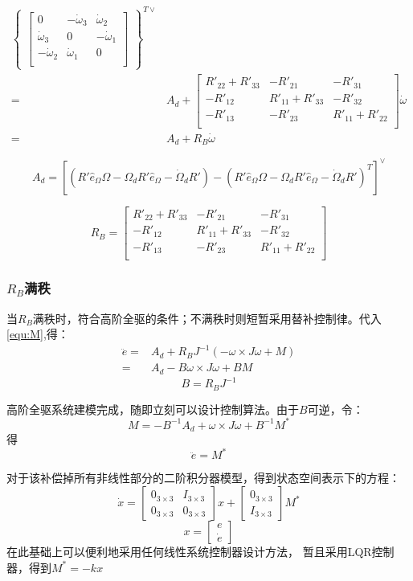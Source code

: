$$\begin{aligned}
\begin{Bmatrix}
\begin{bmatrix}
        0 & -\dot\omega_3 &\dot\omega_2  \\
         \dot\omega_3& 0 &  -\dot\omega_1\\
         -\dot\omega_2&\dot\omega_1  & 0 \\
        \end{bmatrix}\end{Bmatrix}^{T\vee}\\
        =&A_d+\begin{bmatrix}
        R'_{22}+R'_{33} & -R'_{21} & -R'_{31} \\
         -R'_{12}& R'_{11}+R'_{33} & -R'_{32} \\
         -R'_{13}&- R'_{23} & R'_{11}+R'_{22} \\
        \end{bmatrix}\dot \omega\\
        =&A_d+R_B\dot \omega
        \end{aligned}  $$

        $$A_d=[(R' \hat e_\Omega \Omega  -\Omega_d R' \hat e_\Omega -\dot \Omega_d R')-(R' \hat e_\Omega \Omega  -\Omega_d R' \hat e_\Omega -\dot \Omega_d R')^T]^\vee$$

        $$R_B=\begin{bmatrix}
            R'_{22}+R'_{33} & -R'_{21} & -R'_{31} \\
             -R'_{12}& R'_{11}+R'_{33} & -R'_{32} \\
             -R'_{13}&- R'_{23} & R'_{11}+R'_{22} \\
            \end{bmatrix}$$
\subsubsection*{$R_B$满秩}
    当$R_B$满秩时，符合高阶全驱的条件；不满秩时则短暂采用替补控制律。代入\ref{equ:M},得：
    $$\begin{aligned}
        \ddot e=&A_d+R_B J^{-1}(-\omega \times J\omega+M)\\
        =&A_d-B \omega\times J\omega +BM
        \end{aligned}$$
        $$B=R_BJ^{-1}$$

    高阶全驱系统建模完成，随即立刻可以设计控制算法。由于$B$可逆，令：
    $$M=-B^{-1} A_d+\omega \times J\omega +B^{-1}M^*$$
    得
    $$\ddot e=M^*$$

    对于该补偿掉所有非线性部分的二阶积分器模型，得到状态空间表示下的方程：
    $$\dot x=\begin{bmatrix}
        0_{3\times 3} & I_{3\times 3} \\
        0_{3\times 3} & 0_{3\times 3}
    \end{bmatrix} x+\begin{bmatrix}
        0_{3\times 3} \\ I_{3\times 3}
    \end{bmatrix} M^* $$
    $$x=\begin{bmatrix}
        e \\ \dot e
    \end{bmatrix}$$
    在此基础上可以便利地采用任何线性系统控制器设计方法，
    暂且采用LQR控制器，得到$M^*=-kx$
